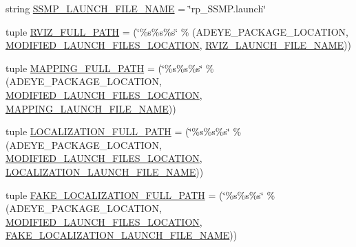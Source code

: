 \begin{DoxyCompactItemize}
string \hyperlink{namespacerp__manager_addd21ac261b0a72d27fa7b982ba438c6}{S\+S\+M\+P\+\_\+\+L\+A\+U\+N\+C\+H\+\_\+\+F\+I\+L\+E\+\_\+\+N\+A\+ME} = \char`\"{}rp\+\_\+\+S\+S\+M\+P.\+launch\char`\"{}
\item 
tuple \hyperlink{namespacerp__manager_a4b6881a6710271456550e946aa632115}{R\+V\+I\+Z\+\_\+\+F\+U\+L\+L\+\_\+\+P\+A\+TH} = (\char`\"{}\%s\%s\%s\char`\"{} \% (A\+D\+E\+Y\+E\+\_\+\+P\+A\+C\+K\+A\+G\+E\+\_\+\+L\+O\+C\+A\+T\+I\+ON, \hyperlink{namespacerp__manager_a43208312336e22fa0f9a976a69e1519e}{M\+O\+D\+I\+F\+I\+E\+D\+\_\+\+L\+A\+U\+N\+C\+H\+\_\+\+F\+I\+L\+E\+S\+\_\+\+L\+O\+C\+A\+T\+I\+ON}, \hyperlink{namespacerp__manager_afed1d2027e1ae55feaab901b6ace615f}{R\+V\+I\+Z\+\_\+\+L\+A\+U\+N\+C\+H\+\_\+\+F\+I\+L\+E\+\_\+\+N\+A\+ME}))
\item 
tuple \hyperlink{namespacerp__manager_af7dfe82383bf37c2c7990a430fd30ae2}{M\+A\+P\+P\+I\+N\+G\+\_\+\+F\+U\+L\+L\+\_\+\+P\+A\+TH} = (\char`\"{}\%s\%s\%s\char`\"{} \% (A\+D\+E\+Y\+E\+\_\+\+P\+A\+C\+K\+A\+G\+E\+\_\+\+L\+O\+C\+A\+T\+I\+ON, \hyperlink{namespacerp__manager_a43208312336e22fa0f9a976a69e1519e}{M\+O\+D\+I\+F\+I\+E\+D\+\_\+\+L\+A\+U\+N\+C\+H\+\_\+\+F\+I\+L\+E\+S\+\_\+\+L\+O\+C\+A\+T\+I\+ON}, \hyperlink{namespacerp__manager_aac197302609510b15a932831ab9345f6}{M\+A\+P\+P\+I\+N\+G\+\_\+\+L\+A\+U\+N\+C\+H\+\_\+\+F\+I\+L\+E\+\_\+\+N\+A\+ME}))
\item 
tuple \hyperlink{namespacerp__manager_a34400d772701b08f8c9a99692b4c3a0e}{L\+O\+C\+A\+L\+I\+Z\+A\+T\+I\+O\+N\+\_\+\+F\+U\+L\+L\+\_\+\+P\+A\+TH} = (\char`\"{}\%s\%s\%s\char`\"{} \% (A\+D\+E\+Y\+E\+\_\+\+P\+A\+C\+K\+A\+G\+E\+\_\+\+L\+O\+C\+A\+T\+I\+ON, \hyperlink{namespacerp__manager_a43208312336e22fa0f9a976a69e1519e}{M\+O\+D\+I\+F\+I\+E\+D\+\_\+\+L\+A\+U\+N\+C\+H\+\_\+\+F\+I\+L\+E\+S\+\_\+\+L\+O\+C\+A\+T\+I\+ON}, \hyperlink{namespacerp__manager_a6dcd95bd9477c77584799b731cf6e853}{L\+O\+C\+A\+L\+I\+Z\+A\+T\+I\+O\+N\+\_\+\+L\+A\+U\+N\+C\+H\+\_\+\+F\+I\+L\+E\+\_\+\+N\+A\+ME}))
\item 
tuple \hyperlink{namespacerp__manager_ad7b467e777f8d6cdf79d68ac4e2cf01b}{F\+A\+K\+E\+\_\+\+L\+O\+C\+A\+L\+I\+Z\+A\+T\+I\+O\+N\+\_\+\+F\+U\+L\+L\+\_\+\+P\+A\+TH} = (\char`\"{}\%s\%s\%s\char`\"{} \% (A\+D\+E\+Y\+E\+\_\+\+P\+A\+C\+K\+A\+G\+E\+\_\+\+L\+O\+C\+A\+T\+I\+ON, \hyperlink{namespacerp__manager_a43208312336e22fa0f9a976a69e1519e}{M\+O\+D\+I\+F\+I\+E\+D\+\_\+\+L\+A\+U\+N\+C\+H\+\_\+\+F\+I\+L\+E\+S\+\_\+\+L\+O\+C\+A\+T\+I\+ON}, \hyperlink{namespacerp__manager_ac4cd90df1f22dfc4387eb36bcfd8215c}{F\+A\+K\+E\+\_\+\+L\+O\+C\+A\+L\+I\+Z\+A\+T\+I\+O\+N\+\_\+\+L\+A\+U\+N\+C\+H\+\_\+\+F\+I\+L\+E\+\_\+\+N\+A\+ME}))

\end{DoxyCompactItemize}
